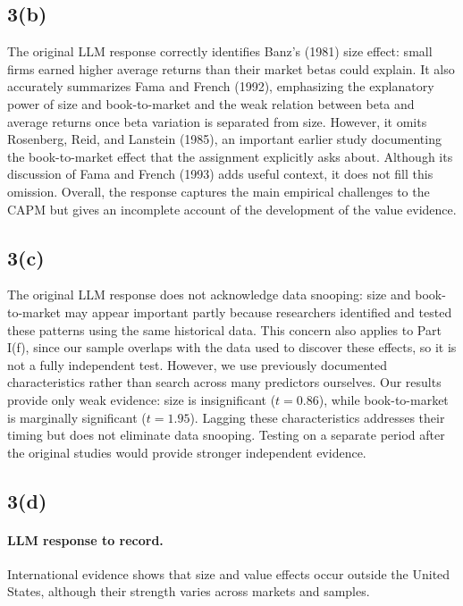 \subsection{3(b)}

The original LLM response correctly identifies Banz's (1981) size effect: small
firms earned higher average returns than their market betas could explain. It
also accurately summarizes Fama and French (1992), emphasizing the explanatory
power of size and book-to-market and the weak relation between beta and average
returns once beta variation is separated from size. However, it omits
Rosenberg, Reid, and Lanstein (1985), an important earlier study documenting
the book-to-market effect that the assignment explicitly asks about. Although
its discussion of Fama and French (1993) adds useful context, it does not fill
this omission. Overall, the response captures the main empirical challenges to
the CAPM but gives an incomplete account of the development of the value
evidence.

\subsection{3(c)}

The original LLM response does not acknowledge data snooping: size and
book-to-market may appear important partly because researchers identified and
tested these patterns using the same historical data. This concern also applies
to Part I(f), since our sample overlaps with the data used to discover these
effects, so it is not a fully independent test. However, we use previously
documented characteristics rather than search across many predictors ourselves.
Our results provide only weak evidence: size is insignificant ($t = 0.86$),
while book-to-market is marginally significant ($t = 1.95$). Lagging these
characteristics addresses their timing but does not eliminate data snooping.
Testing on a separate period after the original studies would provide stronger
independent evidence.

\subsection{3(d)}

\paragraph{LLM response to record.} International evidence shows that size and
value effects occur outside the United States, although their strength varies
across markets and samples.

